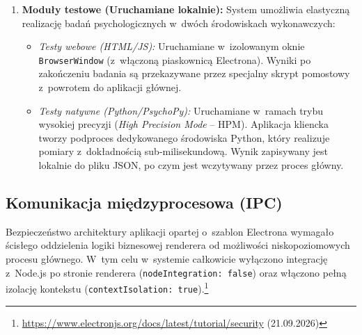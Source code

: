 \documentclass[12pt, a4paper, oneside]{report}
\begin{document}
\begin{enumerate}
	\item \textbf{Moduły testowe (Uruchamiane lokalnie):} System umożliwia elastyczną realizację badań psychologicznych w~dwóch środowiskach wykonawczych:
	      \begin{itemize}
		      \item \textit{Testy webowe (HTML/JS):} Uruchamiane w~izolowanym oknie \texttt{BrowserWindow} (z~włączoną piaskownicą Electrona). Wyniki po zakończeniu badania są przekazywane przez specjalny skrypt pomostowy z~powrotem do aplikacji głównej.
		      \item \textit{Testy natywne (Python/PsychoPy):} Uruchamiane w~ramach trybu wysokiej precyzji (\textit{High Precision Mode} – HPM). Aplikacja kliencka tworzy podproces dedykowanego środowiska Python, który realizuje pomiary z~dokładnością sub-milisekundową. Wynik zapisywany jest lokalnie do pliku JSON, po czym jest wczytywany przez proces główny.
	      \end{itemize}
\end{enumerate}

\subsection{Komunikacja międzyprocesowa (IPC)}
\label{subsec:ipc}

Bezpieczeństwo architektury aplikacji opartej o~szablon Electrona wymagało ścisłego oddzielenia logiki biznesowej renderera od możliwości niskopoziomowych procesu głównego. W~tym celu w~systemie całkowicie wyłączono integrację z~Node.js po stronie renderera (\texttt{nodeIntegration: false}) oraz włączono pełną izolację kontekstu (\texttt{contextIsolation: true}).\footnote{\url{https://www.electronjs.org/docs/latest/tutorial/security} (21.09.2026)}
\end{document}
